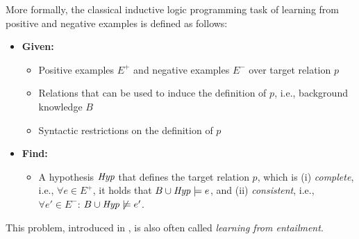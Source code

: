 More formally, the classical inductive logic programming task of learning from positive and negative examples 
is defined as follows:
\begin{definition}\label{def:learnex}
\begin{itemize}
\item[] \textbf{Given:}
\begin{itemize}
\item Positive examples $E^+$ and negative examples $E^-$ over target relation $p$
\item Relations that can be used to induce the definition of $p$, i.e., background knowledge $B$
\item Syntactic restrictions on the definition of $p$
\end{itemize}
\smallskip

\item[] \textbf{Find:}
\begin{itemize}
\item A hypothesis $\mathit{Hyp}$ that defines the target relation $p$, which is (i) \emph{complete}, i.e., $\forall e\in E^+$, it holds that $B \cup \mathit{Hyp} \models e$, and (ii) \emph{consistent}, i.e., $\forall e' \in E^-$: $B \cup \mathit{Hyp} \not \models e'$.
\end{itemize}
\end{itemize}
\end{definition}
 This problem, introduced in \cite{DBLP:journals/ngc/Muggleton91}, is
 also often called \emph{learning from entailment}. 


